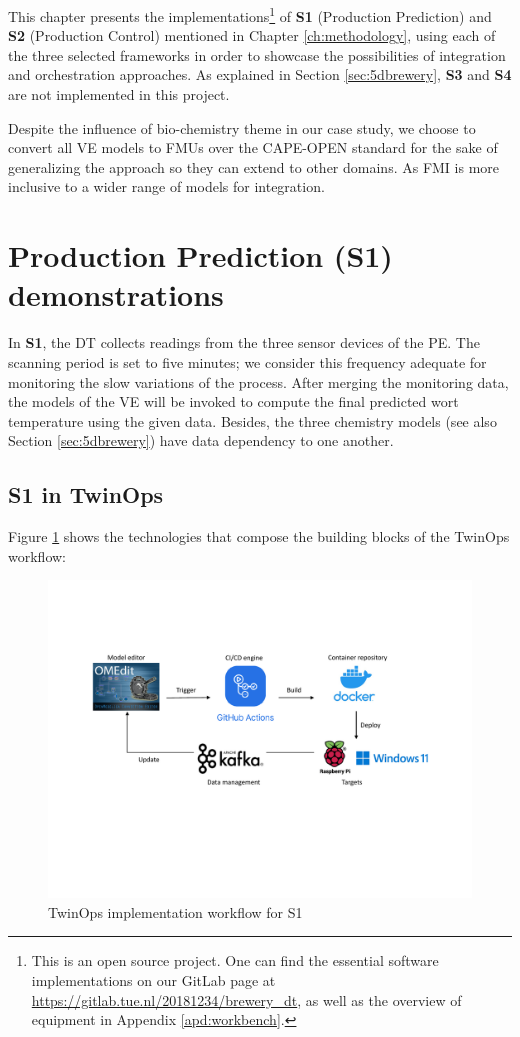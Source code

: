 This chapter presents the implementations\footnote{This is an open source project. One can find the essential software implementations on our GitLab page at \url{https://gitlab.tue.nl/20181234/brewery_dt}, as well as the overview of equipment in Appendix \ref{apd:workbench}.} of \textbf{S1} (Production Prediction) and \textbf{S2} (Production Control) mentioned in Chapter \ref{ch:methodology}, using each of the three selected frameworks in order to showcase the possibilities of integration and orchestration approaches. As explained in Section \ref{sec:5dbrewery}, \textbf{S3} and \textbf{S4} are not implemented in this project.

Despite the influence of bio-chemistry theme in our case study, we choose to convert all VE models to FMUs over the CAPE-OPEN standard for the sake of generalizing the approach so they can extend to other domains. As FMI is more inclusive to a wider range of models for integration.

\section{Production Prediction (S1) demonstrations}\label{sec:s1demo}
In \textbf{S1}, the DT collects readings from the three sensor devices of the PE. The scanning period is set to five minutes; we consider this frequency adequate for monitoring the slow variations of the process. After merging the monitoring data, the models of the VE will be invoked to compute the final predicted wort temperature using the given data. Besides, the three chemistry models (see also Section \ref{sec:5dbrewery}) have data dependency to one another.

\subsection{S1 in TwinOps} \label{sec:s1twop}
Figure \ref{fig:s1_twop_workflow} shows the technologies that compose the building blocks of the TwinOps workflow:

\begin{figure}[hbt!]
  \centering
  \includegraphics[scale=0.6]{figures/s1_twop_workflow.pdf}
  \caption{TwinOps implementation workflow for S1}
  \label{fig:s1_twop_workflow}
\end{figure}

